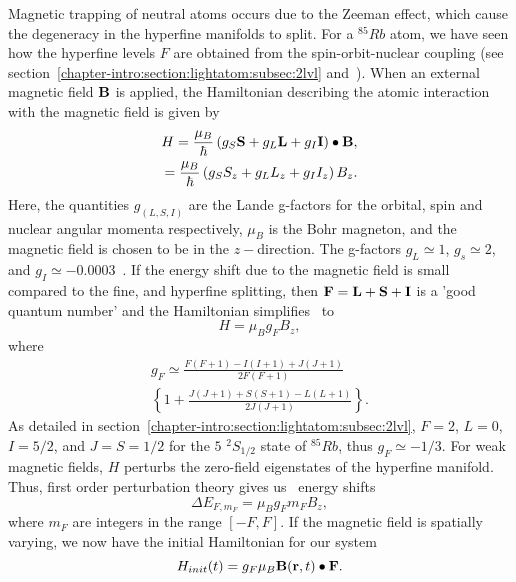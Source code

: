 Magnetic trapping of neutral atoms occurs due to the Zeeman effect, which cause the degeneracy in the hyperfine manifolds to split. For a $^{85}Rb$ atom, we have seen how the hyperfine levels $F$ are obtained from the spin-orbit-nuclear coupling (see section~\ref{chapter-intro:section:lightatom:subsec:2lvl} and~\cite{rbdata}). When an external magnetic field ${\bf B}$ is applied, the Hamiltonian describing the atomic interaction with the magnetic field is given by
\begin{eqnarray}
H=\frac{\mu_B}{\hbar} \left( g_S {\bf S}+g_L{\bf L}+g_I{\bf I}\right) \bullet {\bf B}, \nonumber \\
  = \frac{\mu_B}{\hbar} \left( g_S  S_z+g_L  L_z+g_I I_z\right)  B_z.
\end{eqnarray}
Here, the quantities $g_{(L,S,I)}$ are the Lande g-factors for the orbital, spin and nuclear angular momenta respectively, $\mu_B $ is the Bohr magneton, and the magnetic field is chosen to be in the $z-$direction. The g-factors $g_L\simeq1$, $g_s\simeq 2$, and $g_I\simeq -0.0003$~\cite{rbdata}. If the energy shift due to the magnetic field is small compared to the fine, and hyperfine splitting, then ${\bf F}={\bf L}+{\bf S}+{\bf I}$ is a 'good quantum number' and the Hamiltonian simplifies~\cite{rbdata} to
\begin{equation}
H = \mu_B g_F B_z,
\end{equation}
where
\begin{multline}
g_F \simeq \frac{F(F+1)-I(I+1)+J(J+1)}{2F(F+1)} \\
  \left\{1+ \frac{J(J+1)+S(S+1)-L(L+1)}{2J(J+1)}  \right\}.
\end{multline}
  As detailed in section~\ref{chapter-intro:section:lightatom:subsec:2lvl}, $F=2$, $L=0$, $I=5/2$, and $J=S=1/2$ for the $5$ $^2S_{1/2}$ state of $^{85}Rb$, thus $g_F\simeq-1/3$. For weak magnetic fields, $H$ perturbs the zero-field eigenstates of the hyperfine manifold. Thus, first order perturbation theory gives us~\cite{sakurai} energy shifts
\begin{equation}
\Delta E_{F,m_F} = \mu_B g_F m_F B_z ,
\label{eq:atomic:levels:chapter-intro}
\end{equation}
where $m_F$ are integers in the range $\left[-F, F \right]$. If the magnetic field is spatially varying, we now have the initial Hamiltonian for our system~\cite{lesanovsky:maghamilt}
\begin{equation}
H_{init}(t) = g_F \mu_B {\bf B}({\bf r},t) \bullet {\bf F}.
\label{maghamilt:chapter-intro}
\end{equation}
